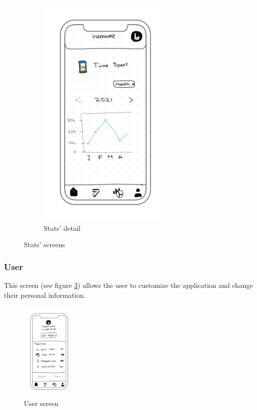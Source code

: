 \begin{figure}[H]
\begin{subfigure}[T]{0.32\textwidth}
        \includegraphics[width=0.72\textwidth]{assets/screens/stats/Stats - 3.png}
        \caption{Stats' detail}
        \label{fig:design_screen_stats_3}
    \end{subfigure}
       \caption{Stats' screens}
       \label{fig:design_screen_stats}
\end{figure}

\subsubsection{User}
This screen (see figure \ref{fig:design_user}) allows the user to customize the application and change their personal information. \\
\begin{figure}[H]
    \centering
        \includegraphics[width=0.24\textwidth]{assets/screens/User.png}
    \caption{User screen}
    \label{fig:design_user}
\end{figure}

